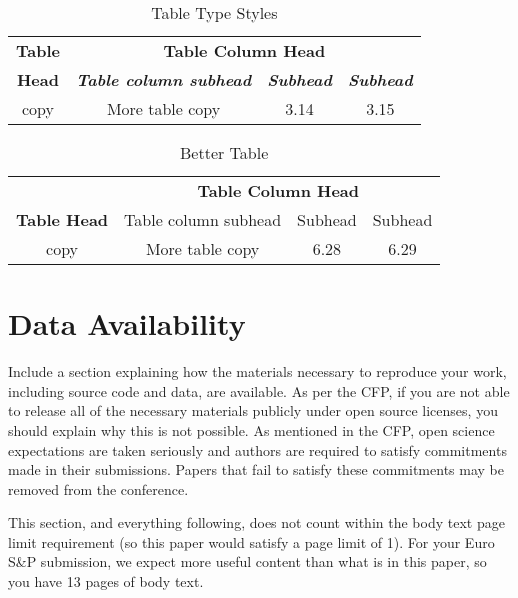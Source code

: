 \documentclass[compsoc, conference, a4paper, 10pt, times]{IEEEtran}
\begin{document}
\begin{table}[b]
\caption{Table Type Styles}\label{tab:ugly}
\begin{center}
\begin{tabular}{|c|c|c|c|}
\hline
\textbf{Table}&\multicolumn{3}{|c|}{\textbf{Table Column Head}} \\
\cline{2-4} 
\textbf{Head} & \textbf{\textit{Table column subhead}}& \textbf{\textit{Subhead}}& \textbf{\textit{Subhead}} \\
\hline
copy& More table copy & 3.14 & 3.15 \\
\hline
\end{tabular}
\label{tab1}
\end{center}
\end{table}

\begin{table}[b]
\caption{Better Table}\label{tab:beautiful}
\begin{center}
\begin{tabular}{cccc}
\toprule
 & \multicolumn{3}{c}{\textbf{Table Column Head}} \\
\textbf{Table Head} & Table column subhead & Subhead & Subhead \\
\midrule
copy& More table copy & 6.28 & 6.29 \\
\bottomrule
\end{tabular}
\label{tab1}
\end{center}
\end{table}

\section*{Data Availability}

Include a section explaining how the materials necessary to reproduce your work, including source code and data, are available. As per the CFP, if you are not able to release all of the necessary materials publicly under open source licenses, you should explain why this is not possible. As mentioned in the CFP, open science expectations are taken seriously and authors are required to satisfy commitments made in their submissions. Papers that fail to satisfy these commitments may be removed from the conference. 

This section, and everything following, does not count within the body text page limit requirement (so this paper would satisfy a page limit of 1). For your Euro S\&P submission, we expect more useful content than what is in this paper, so you have 13 pages of body text. 
\end{document}
